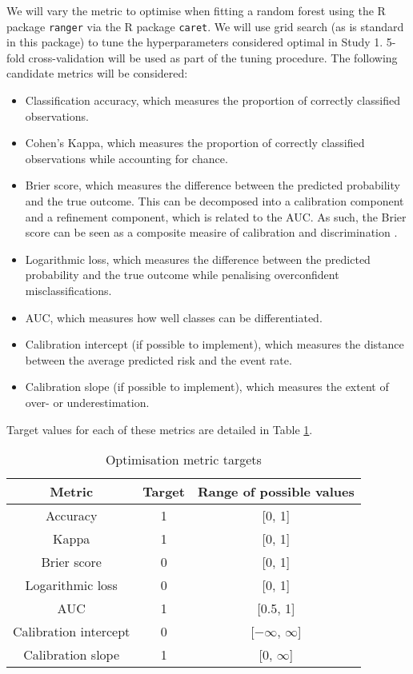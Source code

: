 \documentclass{article}
\begin{document}
We will vary the metric to optimise when fitting a random forest using the R package \texttt{ranger} via the R package \texttt{caret}. We will use grid search (as is standard in this package) to tune the hyperparameters considered optimal in Study 1. 5-fold cross-validation will be used as part of the tuning procedure. The following candidate metrics will be considered:\begin{itemize}
    \item Classification accuracy, which measures the proportion of correctly classified observations.
    \item Cohen's Kappa, which measures the proportion of correctly classified observations while accounting for chance.
    \item Brier score, which measures the difference between the predicted probability and the true outcome. This can be decomposed into a calibration component and a refinement component, which is related to the AUC. As such, the Brier score can be seen as a composite measire of calibration and discrimination \cite{luijken_impact_2019}.
    \item Logarithmic loss, which measures the difference between the predicted probability and the true outcome while penalising overconfident misclassifications.
    \item AUC, which measures how well classes can be differentiated.
    \item Calibration intercept (if possible to implement), which measures the distance between the average predicted risk and the event rate.
    \item Calibration slope (if possible to implement), which measures the extent of over- or underestimation.
\end{itemize}

Target values for each of these metrics are detailed in Table \ref{tab:metrics}.

\begin{table}[]
    \caption{Optimisation metric targets}
    \centering
    \begin{tabular}{|c|c|c|}
        \hline \rowcolor{orange!50}
        Metric & Target & Range of possible values \\
        \hline
        Accuracy & 1 & [0, 1]\\
        Kappa & 1 & [0, 1]\\
        Brier score & 0 & [0, 1]\\
        Logarithmic loss & 0 & [0, 1]\\
        AUC & 1 & [0.5, 1]\\
        Calibration intercept & 0 & [$-\infty$, $\infty$]\\
        Calibration slope & 1 & [0, $\infty$]\\
        \hline
    \end{tabular}
    \label{tab:metrics}
\end{table}
\end{document}
